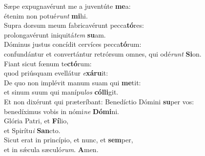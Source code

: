 \evenverse Sæpe expugnavérunt me a juventúte \textbf{me}a:~\*\\
\evenverse étenim non potué\textit{runt} \textbf{mi}hi.\\
\oddverse Supra dorsum meum fabricavérunt pecca\textbf{tó}res:~\*\\
\oddverse prolongavérunt iniquitá\textit{tem} \textbf{su}am.\\
\evenverse Dóminus justus concídit cervíces pecca\textbf{tó}rum:~\*\\
\evenverse confundántur et convertántur retrórsum omnes, qui odé\textit{runt} \textbf{Si}on.\\
\oddverse Fiant sicut fœnum te\textbf{ctó}rum:~\*\\
\oddverse quod priúsquam evellátur \textit{e}\textbf{xá}\textbf{ru}it:\\
\evenverse De quo non implévit manum suam qui \textbf{me}tit:~\*\\
\evenverse et sinum suum qui manípu\textit{los} \textbf{cól}\textbf{li}git.\\
\oddverse Et non dixérunt qui præteríbant: Benedíctio Dómini \textbf{su}per vos:~\*\\
\oddverse benedíximus vobis in nómi\textit{ne} \textbf{Dó}\textbf{mi}ni.\\
\evenverse Glória Patri, et \textbf{Fí}lio,~\*\\
\evenverse et Spirítu\textit{i} \textbf{San}cto.\\
\oddverse Sicut erat in princípio, et nunc, et \textbf{sem}per,~\*\\
\oddverse et in sǽcula sæculó\textit{rum}. \textbf{A}men.\\
